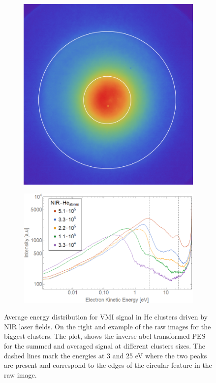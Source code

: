 \begin{figure}[h!]
\centering
\begin{subfigure}[l]{0.4\textwidth}
\includegraphics[width=1\textwidth]{../Images/results/Comparison_energyDistribution/NIr_He_12K.png}   				\end{subfigure}
\begin{subfigure}[l]{0.59\textwidth}
\includegraphics[width=1\textwidth]{../Images/results/Comparison_energyDistribution/NIR_He_summed_energydist.png} 
\end{subfigure}

\caption[Average energy distributions in NIr]{Average energy distribution for VMI signal in He clusters driven by NIR laser fields. On the right and example of the raw images for the biggest clusters. The plot, shows the inverse abel transformed PES for the summed and averaged signal at different clusters sizes. The dashed lines mark the energies at 3 and 25 eV where the two peaks are present and correspond to the edges of the circular feature in the raw image.}
\label{fig:NIrsummed}
\end{figure}


